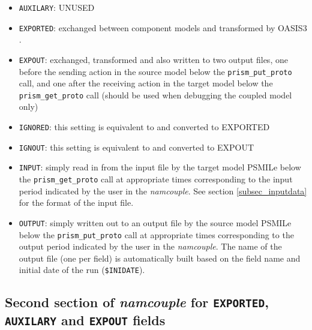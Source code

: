\begin{itemize}
\item {\tt AUXILARY}: UNUSED
\item {\tt EXPORTED}: exchanged between component models and
  transformed by OASIS3 .
\item {\tt EXPOUT}: exchanged, transformed and also written to two
  output files, one before the sending action in the source model
  below the {\tt prism\_put\_proto} call, and one after the receiving
  action in the target model below the {\tt prism\_get\_proto} call (should
  be used when debugging the coupled model only)
\item {\tt IGNORED}: this setting is equivalent to and converted to EXPORTED
\item {\tt IGNOUT}: this setting is equivalent to and converted to EXPOUT
\item {\tt INPUT}: simply read in from the input file by the target
  model PSMILe below the {\tt prism\_get\_proto} call at appropriate
  times corresponding to the input period indicated by the user in the
  {\it namcouple}. See section
  \ref{subsec_inputdata} for the format of the input file.
\item {\tt OUTPUT}: simply written out to an output file by the source
  model PSMILe below the {\tt prism\_put\_proto} call at appropriate
  times corresponding to the output period indicated by the user in
  the {\it namcouple}. The name of the output file (one per field) is
  automatically built based on the field name and initial date of the
  run ({\tt \$INIDATE}).

\end{itemize}

\subsection{Second section of {\it namcouple} for {\tt EXPORTED}, {\tt
      AUXILARY} and {\tt EXPOUT} fields}
\label{subsubsec_secondEXPORTED}

